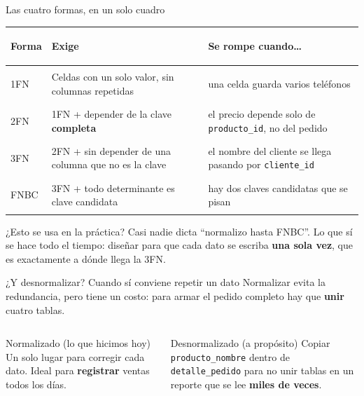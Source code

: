 \documentclass[aspectratio=169,10pt,c]{beamer}
\newcommand{\tbl}[1]{\textcolor{utpNaranja}{\texttt{#1}}}
\begin{document}
\begin{frame}{Las cuatro formas, en un solo cuadro}
\begin{center}
\footnotesize{}
\begin{tabular}{>{\bfseries\raggedright\arraybackslash}p{1.6cm}>{\raggedright\arraybackslash}p{5.4cm}>{\raggedright\arraybackslash}p{4.3cm}}
\toprule
Forma & Exige & Se rompe cuando\ldots \\
\midrule
1FN & Celdas con un solo valor, sin columnas repetidas & una celda guarda varios teléfonos \\[4pt]
2FN & 1FN + depender de la clave \textbf{completa} & el precio depende solo de \texttt{producto\_id}, no del pedido \\[4pt]
3FN & 2FN + sin depender de una columna que no es la clave & el nombre del cliente se llega pasando por \texttt{cliente\_id} \\[4pt]
FNBC & 3FN + todo determinante es clave candidata & hay dos claves candidatas que se pisan \\
\bottomrule
\end{tabular}
\end{center}
\vspace{0.25cm}
\begin{block}{¿Esto se usa en la práctica?}
\small Casi nadie dicta ``normalizo hasta FNBC''. Lo que sí se hace todo el tiempo: diseñar para que cada dato se escriba \textbf{una sola vez}, que es exactamente a dónde llega la 3FN.
\end{block}
\end{frame}

\begin{frame}{¿Y desnormalizar? Cuando sí conviene repetir un dato}
\small Normalizar evita la redundancia, pero tiene un costo: para armar el pedido completo hay que \textbf{unir} cuatro tablas.
\vspace{0.25cm}
\begin{columns}[T,onlytextwidth]
\begin{exampleblock}{Normalizado (lo que hicimos hoy)}
\small Un solo lugar para corregir cada dato. Ideal para \textbf{registrar} ventas todos los días.
\end{exampleblock}
\begin{alertblock}{Desnormalizado (a propósito)}
\small Copiar \texttt{producto\_nombre} dentro de \tbl{detalle\_pedido} para no unir tablas en un reporte que se lee \textbf{miles de veces}.
\end{alertblock}
\end{columns}
\vspace{0.3cm}
\end{frame}
\end{document}
